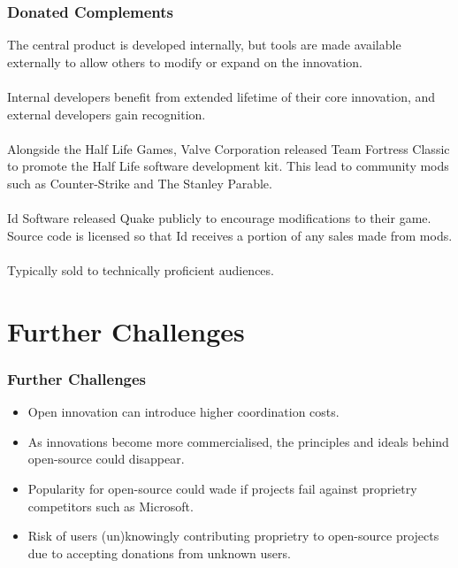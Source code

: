 \documentclass{beamer}
\begin{document}

\begin{frame}
\frametitle{Donated Complements}
The central product is developed internally, but tools are made available externally to allow others to modify or expand on the innovation.\\~\\

Internal developers benefit from extended lifetime of their core innovation, and external developers gain recognition.\\~\\

Alongside the Half Life Games, Valve Corporation released Team Fortress Classic to promote the Half Life software development kit. This lead to community mods such as Counter-Strike and The Stanley Parable.\\~\\

Id Software released Quake publicly to encourage modifications to their game. Source code is licensed so that Id receives a portion of any sales made from mods.\\~\\

Typically sold to technically proficient audiences.
\end{frame}

\section{Further Challenges}

\begin{frame}
\frametitle{Further Challenges}
\begin{itemize}
\item Open innovation can introduce higher coordination costs.
\item As innovations become more commercialised, the principles and ideals behind open-source could disappear.
\item Popularity for open-source could wade if projects fail against proprietry competitors such as Microsoft.
\item Risk of users (un)knowingly contributing proprietry to open-source projects due to accepting donations from unknown users.
\end{itemize}
\end{frame}
\end{document}
